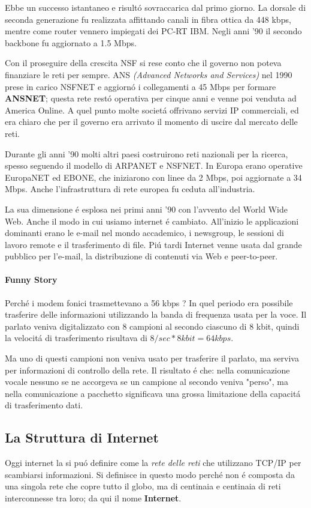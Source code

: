 \documentclass[12pt]{article}
\begin{document}
Ebbe un successo istantaneo e risult\'o sovraccarica dal primo giorno. La dorsale di seconda generazione fu realizzata affittando 
canali in fibra ottica da 448 kbps, mentre come router vennero impiegati dei PC-RT IBM. Negli anni '90 il secondo backbone fu 
aggiornato a 1.5 Mbps.

Con il proseguire della crescita NSF si rese conto che il governo non poteva finanziare le reti per sempre. ANS \textit{(Advanced 
Networks and Services)} nel 1990 prese in carico NSFNET e aggiorn\'o i collegamenti a 45 Mbps per formare \textbf{ANSNET}; questa 
rete rest\'o operativa per cinque anni e venne poi venduta ad America Online. A quel punto molte societ\'a offrivano servizi IP 
commerciali, ed era chiaro che per il governo era arrivato il momento di uscire dal mercato delle reti.

Durante gli anni '90 molti altri paesi costruirono reti nazionali per la ricerca, spesso seguendo il modello di ARPANET e NSFNET.
In Europa erano operative EuropaNET ed EBONE, che iniziarono con linee da 2 Mbps, poi aggiornate a 34 Mbps. Anche l'infrastruttura 
di rete europea fu ceduta all'industria.

La sua dimensione \'e esplosa nei primi anni '90 con l'avvento del World Wide Web. Anche il modo in cui usiamo internet \'e 
cambiato. All'inizio le applicazioni dominanti erano le e-mail nel mondo accademico, i newsgroup, le sessioni di lavoro remote e il 
trasferimento di file. Pi\'u tardi Internet venne usata dal grande pubblico per l'e-mail, la distribuzione di contenuti via Web e 
peer-to-peer.

\paragraph{Funny Story} Perch\'e i modem fonici trasmettevano a 56 kbps ? In quel periodo era possibile trasferire delle 
informazioni utilizzando la banda di frequenza usata per la voce. Il parlato veniva digitalizzato con 8 campioni al secondo ciascuno 
di 8 kbit, quindi la velocit\'a di trasferimento risultava di $8/sec * 8 kbit = 64 kbps$.

Ma uno di questi campioni non veniva usato per trasferire il parlato, ma serviva per informazioni di controllo della rete. Il 
risultato \'e che: nella comunicazione vocale nessuno se ne accorgeva se un campione al secondo veniva "perso", ma nella 
comunicazione a pacchetto significava una grossa limitazione della capacit\'a di trasferimento dati.

\clearpage
\subsection{La Struttura di Internet}\label{la-struttura-di-internet}
Oggi internet la si pu\'o definire come la \textit{rete delle reti} che utilizzano TCP/IP per scambiarsi informazioni. Si definisce 
in questo modo perch\'e non \'e composta da una singola rete che copre tutto il globo, ma di centinaia e centinaia di reti 
interconnesse tra loro; da qui il nome \textbf{Internet}.
\end{document}
